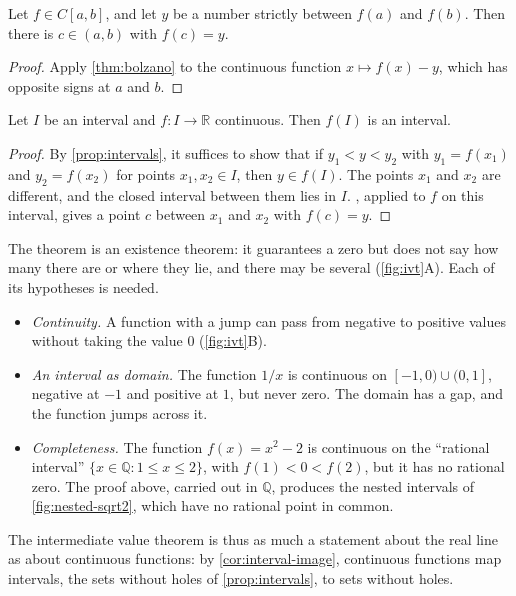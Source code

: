 \begin{corollary}
\label{cor:ivt}
Let $f\in C[a,b]$, and let $y$ be a number strictly between $f(a)$ and $f(b)$. Then there is $c\in(a,b)$ with $f(c)=y$.
\end{corollary}

\begin{proof}
Apply \cref{thm:bolzano} to the continuous function $x\mapsto f(x)-y$, which has opposite signs at $a$ and $b$.
\end{proof}

\begin{corollary}
\label{cor:interval-image}
Let $I$ be an interval and $f\colon I\to\mathbb R$ continuous. Then $f(I)$ is an interval.
\end{corollary}

\begin{proof}
By \cref{prop:intervals}, it suffices to show that if $y_1<y<y_2$ with $y_1=f(x_1)$ and $y_2=f(x_2)$ for points $x_1,x_2\in I$, then $y\in f(I)$. The points $x_1$ and $x_2$ are different, and the closed interval between them lies in $I$. , applied to $f$ on this interval, gives a point $c$ between $x_1$ and $x_2$ with $f(c)=y$.
\end{proof}

The theorem is an existence theorem: it guarantees a zero but does not say how many there are or where they lie, and there may be several (\cref{fig:ivt}A). Each of its hypotheses is needed.
\begin{itemize}
\item \emph{Continuity.} A function with a jump can pass from negative to positive values without taking the value $0$ (\cref{fig:ivt}B).
\item \emph{An interval as domain.} The function $1/x$ is continuous on $[-1,0)\cup(0,1]$, negative at $-1$ and positive at $1$, but never zero. The domain has a gap, and the function jumps across it.
\item \emph{Completeness.} The function $f(x)=x^2-2$ is continuous on the ``rational interval'' $\{x\in\mathbb Q: 1\le x\le2\}$, with $f(1)<0<f(2)$, but it has no rational zero. The proof above, carried out in $\mathbb Q$, produces the nested intervals of \cref{fig:nested-sqrt2}, which have no rational point in common.
\end{itemize}
The intermediate value theorem is thus as much a statement about the real line as about continuous functions: by \cref{cor:interval-image}, continuous functions map intervals, the sets without holes of \cref{prop:intervals}, to sets without holes.

